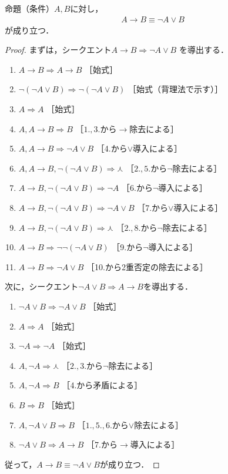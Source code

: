  \begin{thm} \label{thm:ganilor}
   命題（条件）$A,  B$に対し，
   \begin{align}
     A \to B \equiv \lnot A \lor B
   \end{align}
   が成り立つ．
 \end{thm}
 \begin{proof} 
   まずは，シークエント$A \to B \Longrightarrow \lnot A \lor B$
   を導出する．
   \begin{enumerate}[1. ]
     \item $A \to B \Longrightarrow A \to B $ \quad ［始式］ 
     \item $\lnot ( \lnot A \lor B ) \Longrightarrow 
            \lnot ( \lnot A \lor B ) $ \quad ［始式（背理法で示す）］
     \item $A \Longrightarrow A$ \quad ［始式］
     \item $A ,  A \to B \Longrightarrow B $ \quad ［$1.,3.$から$\to$除去による］
     \item $A ,  A \to B \Longrightarrow \lnot A \lor B$ 
            \quad ［4.から$\lor$導入による］
     \item $A ,  A \to B ,  \lnot ( \lnot A \lor B ) 
            \Longrightarrow \curlywedge $ \quad ［$2.,5.$から$\lnot$除去による］ 
     \item $A \to B ,  \lnot ( \lnot A \lor B ) 
            \Longrightarrow \lnot A $ \quad ［6.から$\lnot$導入による］ 
     \item $A \to B ,  \lnot ( \lnot A \lor B ) 
            \Longrightarrow \lnot A \lor B 
            $ \quad ［7.から$\lor$導入による］ 
     \item $A \to B ,  \lnot ( \lnot A \lor B ) 
            \Longrightarrow \curlywedge $ \quad ［$2.,8.$から$\lnot$除去による］ 
     \item $A \to B \Longrightarrow \lnot \lnot ( \lnot A \lor B ) 
            $ \quad ［9.から$\lnot$導入による］ 
     \item $ A \to B \Longrightarrow \lnot A \lor B $ \quad ［10.から2重否定の除去による］
   \end{enumerate}
   次に，シークエント$\lnot A \lor B \Longrightarrow A \to B$を導出する．
   \begin{enumerate}[1. ]
     \item $\lnot A \lor B \Longrightarrow \lnot A \lor B$ \quad ［始式］
     \item $A \Longrightarrow A$ \quad ［始式］
     \item $\lnot A \Longrightarrow \lnot A$ \quad ［始式］
     \item $A,  \lnot A \Longrightarrow \curlywedge$ \quad ［$2., 3.$から$\lnot$除去による］
     \item $A ,  \lnot A \Longrightarrow B$ \quad ［4.から矛盾による］
     \item $B \Longrightarrow B$ \quad ［始式］
     \item $A,  \lnot A \lor B \Longrightarrow B$ \quad ［$1., 5., 6.$から$\lor$除去による］
     \item $\lnot A \lor B \Longrightarrow A \to B$ \quad ［7.から$\to$導入による］
   \end{enumerate}
   従って，$A \to B \equiv \lnot A \lor B$が成り立つ．
   \end{proof}
